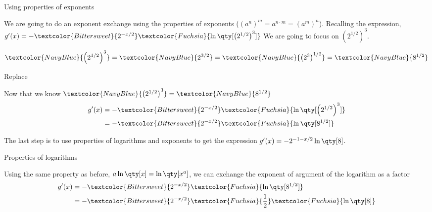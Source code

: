 \documentclass[../tufte-style.tex]{standalone}
\begin{document}
\begin{frame}{Using properties of exponents}

    We are going to do an exponent exchange using the properties of exponents (\((a^{n})^{m} = a^{n\cdot m} = (a^{m})^{n}\)).
    Recalling the expression, \(g'(x) = -\textcolor{Bittersweet}{2^{-x/2}}\textcolor{Fuchsia}{\ln\qty[\left(2^{1/2}\right)^{3}]}\)
    We are going to focus on \textcolor{NavyBlue}{\(\left(2^{1/2}\right)^{3}\)}.

    \begin{align*}
        \textcolor{NavyBlue}{\left(2^{1/2}\right)^{3}} = \textcolor{NavyBlue}{2^{3/2}} = \textcolor{NavyBlue}{\left(2^{3}\right)^{1/2}} = \textcolor{NavyBlue}{8^{1/2}}
    \end{align*}

\end{frame}

\begin{frame}{Replace}

    Now that we know \(\textcolor{NavyBlue}{\left(2^{1/2}\right)^{3}} = \textcolor{NavyBlue}{8^{1/2}}\)
    \begin{align*}
        g'(x) &= -\textcolor{Bittersweet}{2^{-x/2}}\textcolor{Fuchsia}{\ln\qty[\left(2^{1/2}\right)^{3}]} \\
              &= -\textcolor{Bittersweet}{2^{-x/2}}\textcolor{Fuchsia}{\ln\qty[8^{1/2}]} 
    \end{align*}

    The last step is to use properties of logarithms and exponents to get the expression \(g'(x)=-2^{-1-x/2}\ln\qty[8]\).

\end{frame}

\begin{frame}{Properties of logarithms}

    Using the same property as before, \textcolor{Fuchsia}{\(a\ln\qty[x] = \ln\qty[x^{a}]\)}, we can exchange the exponent of argument of the logarithm as a factor
    \begin{align*}
        g'(x) &= -\textcolor{Bittersweet}{2^{-x/2}}\textcolor{Fuchsia}{\ln\qty[8^{1/2}]} \\
              &= -\textcolor{Bittersweet}{2^{-x/2}}\textcolor{Fuchsia}{\frac{1}{2}}\textcolor{Fuchsia}{\ln\qty[8]} 
    \end{align*}

\end{frame}
\end{document}
